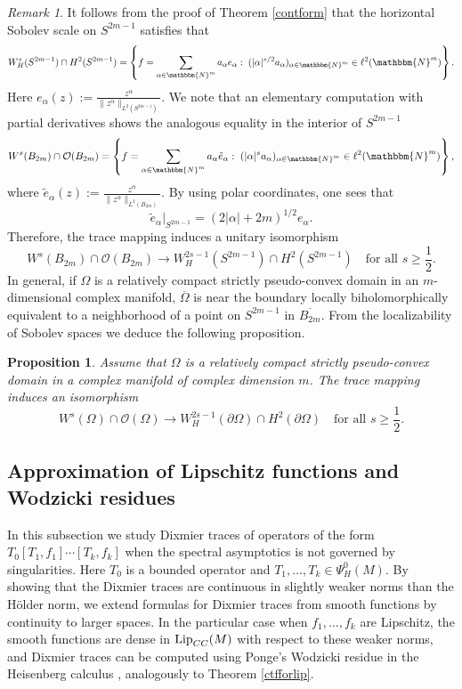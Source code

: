 \documentclass[10pt]{amsart}
\newtheorem{prop}[thm]{Proposition}
\theoremstyle{remark}
\newtheorem{remark}[thm]{Remark}
\theoremstyle{definition}
\begin{document}
\begin{remark}
It follows from the proof of Theorem \ref{contform} that the horizontal Sobolev scale on $S^{2m-1}$ satisfies that
$$W^s_H(S^{2m-1})\cap H^2(S^{2m-1})=\left\{f=\sum_{\alpha\in {\mathbbm{N}}^m} a_\alpha e_\alpha: \;(|\alpha|^{s/2}a_\alpha)_{\alpha\in {\mathbbm{N}}^m}\in \ell^2({\mathbbm{N}}^m)\right\}.$$
Here $e_\alpha(z):=\frac{z^\alpha}{\|z^\alpha\|_{L^2(S^{2m-1})}}$. We note that an elementary computation with partial derivatives shows the analogous equality in the interior of $S^{2m-1}$
$$W^s(B_{2m})\cap \mathcal{O}(B_{2m})=\left\{f=\sum_{\alpha\in {\mathbbm{N}}^m} a_\alpha \tilde{e}_\alpha: \;(|\alpha|^{s}a_\alpha)_{\alpha\in {\mathbbm{N}}^m}\in \ell^2({\mathbbm{N}}^m)\right\},$$
where $\tilde{e}_\alpha(z):=\frac{z^\alpha}{\|z^\alpha\|_{L^2(B_{2m})}}$. By using polar coordinates, one sees that 
$$\tilde{e}_\alpha|_{S^{2m-1}}=(2|\alpha|+2m)^{1/2}e_\alpha.$$
Therefore, the trace mapping induces a unitary isomorphism 
$$W^s(B_{2m})\cap \mathcal{O}(B_{2m})\to W^{2s-1}_H(S^{2m-1})\cap H^2(S^{2m-1})\quad\mbox{for all $s\geq \frac{1}{2}$}.$$
In general, if $\Omega$ is a relatively compact strictly pseudo-convex domain in an $m$-dimensional complex manifold, $\overline{\Omega}$ is near the boundary locally biholomorphically equivalent to a neighborhood of a point on $S^{2m-1}$ in $\overline{B_{2m}}$. From the localizability of Sobolev spaces we deduce the following proposition.
\end{remark}

\begin{prop}
Assume that $\Omega$ is a relatively compact strictly pseudo-convex domain in a complex manifold of complex dimension $m$. The trace mapping induces an isomorphism 
$$W^s(\Omega)\cap \mathcal{O}(\Omega)\to W^{2s-1}_H(\partial \Omega)\cap H^2(\partial \Omega)\quad\mbox{for all $s\geq \frac{1}{2}$}.$$
\end{prop}

\subsection{Approximation of Lipschitz functions and Wodzicki residues}
\label{approximatingbyw1d}

In this subsection we study Dixmier traces of operators of the form $T_0[T_1,f_1]\cdots [T_{k},f_{k}]$ when the spectral asymptotics is not governed by singularities. Here $T_0$ is a bounded operator and $T_1,\ldots, T_k\in \Psi^0_H(M)$. By showing that the Dixmier traces are continuous in slightly weaker norms than the H\"older norm, we extend formulas for Dixmier traces from smooth functions by continuity to larger spaces. In the particular case when $f_1,\dots,f_k$ are Lipschitz, the smooth functions are dense in ${\textnormal{Lip}}_{CC}(M)$ with respect to these weaker norms, and Dixmier traces can be computed using Ponge's Wodzicki residue in the Heisenberg calculus \cite{pongeresidue}, analogously to Theorem \ref{ctfforlip}.
\end{document}
